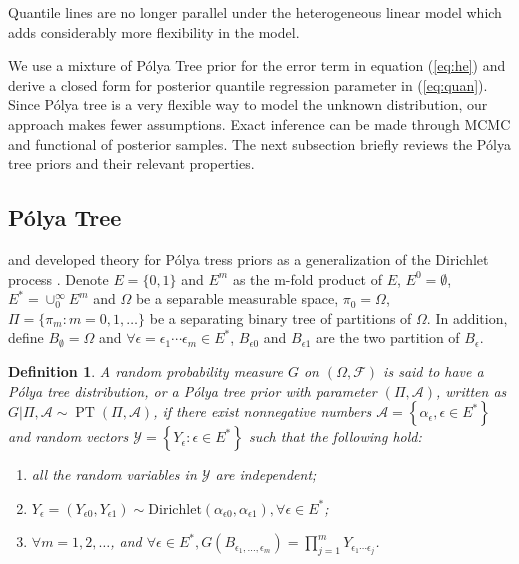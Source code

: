 \documentclass[12pt]{article}
\newtheorem{deff}[thm]{Definition}
\newcommand{\polya}{P\'{o}lya}
\DeclareMathOperator{\pt}{PT}
\begin{document}
Quantile lines are no longer parallel under the heterogeneous linear
model which adds considerably more flexibility in the model.

We use a mixture of \polya{} Tree prior for the error term in equation
(\ref{eq:he}) and derive a closed form for posterior quantile
regression parameter in (\ref{eq:quan}).  Since \polya{} tree is a
very flexible way to model the unknown distribution, our approach
makes fewer assumptions.  Exact inference can be made through MCMC and
functional of posterior samples. The next subsection briefly reviews
the \polya{} tree priors and their relevant properties.

\subsection{\polya{} Tree}
\citet{lavine1992, lavine1994} and \citet{mauldin1992} developed
theory for \polya{} tress priors as a generalization of the Dirichlet
process \citep{ferguson1974}. Denote $E=\{0,1\}$ and $E^m$ as the
m-fold product of $E$, $E^0= \emptyset$, $E^{*} = \cup_0^{\infty} E^m$
and $\Omega$ be a separable measurable space, $\pi_0 = \Omega$, $\Pi=
\{ \pi_m: m=0,1, \ldots \} $ be a separating binary tree of partitions
of $\Omega$. In addition, define $B_{\emptyset} = \Omega$ and $\forall
\epsilon=\epsilon_1\cdots \epsilon_m \in E^{*}$, $B_{\epsilon 0}$ and
$B_{\epsilon 1}$ are the two partition of $B_{\epsilon}$.
\begin{deff}
  A random probability measure $G$ on $(\Omega, \mathcal{F})$ is said
  to have a \polya{} tree distribution, or a \polya{} tree prior with
  parameter $(\Pi, \mathcal{A})$, written as $G|\Pi, \mathcal{A} \sim
  \pt (\Pi, \mathcal{A})$, if there exist nonnegative numbers
  $\mathcal{A}= \left\{ \alpha_{\epsilon}, \epsilon \in E^{*}
  \right\}$ and random vectors $\mathcal{Y} = \left\{ Y_{\epsilon} :
    \epsilon \in E^{*} \right\}$ such that the following hold:
  \begin{enumerate}
  \item\label{item:1} all the random variables in $\mathcal{Y}$ are
    independent;
  \item $Y_{\epsilon}= (Y_{\epsilon 0}, Y_{\epsilon 1}) \sim
    \mathrm{Dirichlet}(\alpha_{\epsilon 0 }, \alpha_{\epsilon 1}),
    \forall \epsilon \in E^{*}$;
  \item $\forall m=1,2, \ldots$, and $\forall \epsilon \in E^{*},
    G(B_{\epsilon_{1}, \ldots, \epsilon_m}) = \prod_{j=1}^m
    Y_{\epsilon_1 \cdots \epsilon_j}$.
  \end{enumerate}
\end{deff}
\end{document}
